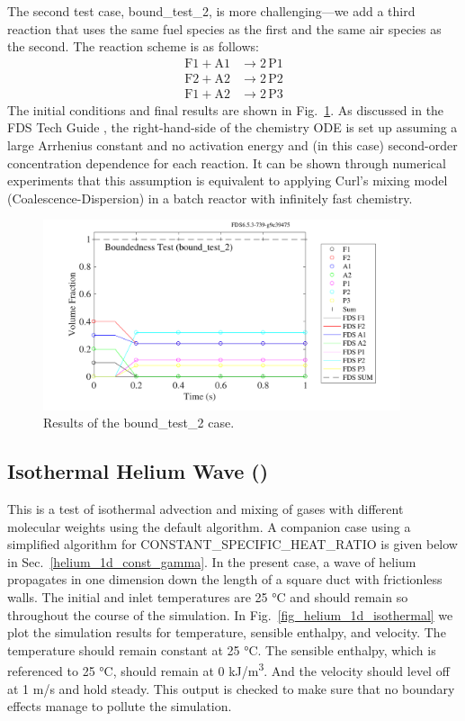 \documentclass[11pt]{book}
\begin{document}
The second test case, {\ct bound\_test\_2}, is more challenging---we add a third reaction that uses the same fuel species as the first and the same air species as the second.  The reaction scheme is as follows:
\begin{align}
\mathrm{F1} + \mathrm{A1} &\rightarrow 2\,\mathrm{P1} \\
\mathrm{F2} + \mathrm{A2} &\rightarrow 2\,\mathrm{P2} \\
\mathrm{F1} + \mathrm{A2} &\rightarrow 2\,\mathrm{P3}
\end{align}
The initial conditions and final results are shown in Fig.~\ref{fig:bound_test_2}.  As discussed in the FDS Tech Guide \cite{FDS_Math_Guide}, the right-hand-side of the chemistry ODE is set up assuming a large Arrhenius constant and no activation energy and (in this case) second-order concentration dependence for each reaction.  It can be shown through numerical experiments that this assumption is equivalent to applying Curl's mixing model (Coalescence-Dispersion) \cite{Curl:1} in a batch reactor with infinitely fast chemistry.
\begin{figure}[!ht]
   \centering
   \includegraphics[height=2.2in]{SCRIPT_FIGURES/bound_test_2}
   \caption[Results of the {\ct bound\_test\_2} case]{Results of the {\ct bound\_test\_2} case.}
   \label{fig:bound_test_2}
\end{figure}

\subsection{Isothermal Helium Wave (\texorpdfstring{}{helium\_1d\_isothermal})}
\label{helium_1d_isothermal}

This is a test of isothermal advection and mixing of gases with different molecular weights using the default algorithm.  A companion case using a simplified algorithm for {\ct CONSTANT\_SPECIFIC\_HEAT\_RATIO} is given below in Sec.~\ref{helium_1d_const_gamma}.  In the present case, a wave of helium propagates in one dimension down the length of a square duct with frictionless walls.  The initial and inlet temperatures are 25 \si{\degreeCelsius} and should remain so throughout the course of the simulation. In Fig.~\ref{fig_helium_1d_isothermal} we plot the simulation results for temperature, sensible enthalpy, and velocity.  The temperature should remain constant at 25 \si{\degreeCelsius}.  The sensible enthalpy, which is referenced to 25 \si{\degreeCelsius}, should remain at 0 \si{kJ/m^3}.  And the velocity should level off at 1 m/s and hold steady.  This output is checked to make sure that no boundary effects manage to pollute the simulation.
\end{document}
